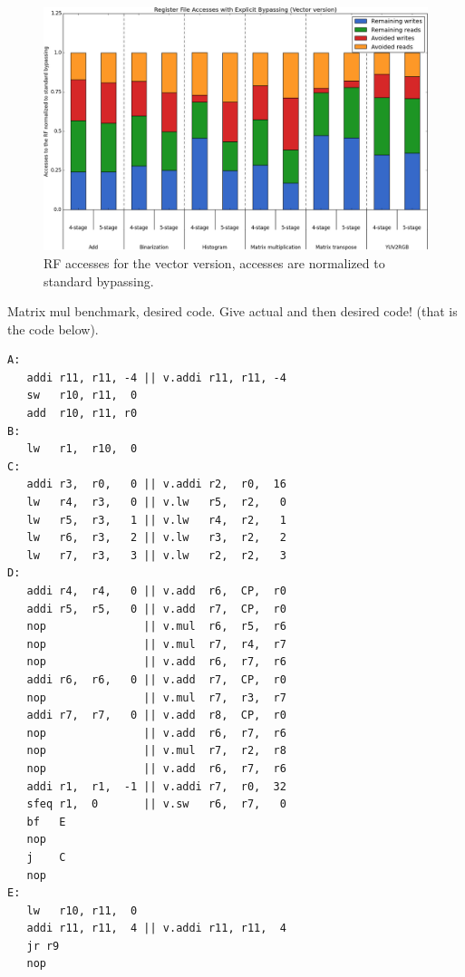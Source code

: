 \begin{figure}[t!]
\centering
\hspace*{-.12in}
\includegraphics[width=\textwidth]{figures/stats/vec_accesses}
\caption{RF accesses for the vector version, accesses are normalized to standard bypassing.}
\label{fig:vec_accesses}
\end{figure}


\newpage

Matrix mul benchmark, desired code. Give actual and then desired code! (that is the code below).






\begin{lstlisting}
A:
   addi r11, r11, -4 || v.addi r11, r11, -4
   sw   r10, r11,  0
   add  r10, r11, r0
B:
   lw   r1,  r10,  0
C:
   addi r3,  r0,   0 || v.addi r2,  r0,  16
   lw   r4,  r3,   0 || v.lw   r5,  r2,   0
   lw   r5,  r3,   1 || v.lw   r4,  r2,   1
   lw   r6,  r3,   2 || v.lw   r3,  r2,   2
   lw   r7,  r3,   3 || v.lw   r2,  r2,   3
D:
   addi r4,  r4,   0 || v.add  r6,  CP,  r0
   addi r5,  r5,   0 || v.add  r7,  CP,  r0
   nop               || v.mul  r6,  r5,  r6
   nop               || v.mul  r7,  r4,  r7
   nop               || v.add  r6,  r7,  r6
   addi r6,  r6,   0 || v.add  r7,  CP,  r0
   nop               || v.mul  r7,  r3,  r7
   addi r7,  r7,   0 || v.add  r8,  CP,  r0
   nop               || v.add  r6,  r7,  r6
   nop               || v.mul  r7,  r2,  r8
   nop               || v.add  r6,  r7,  r6
   addi r1,  r1,  -1 || v.addi r7,  r0,  32
   sfeq r1,  0       || v.sw   r6,  r7,   0
   bf   E
   nop
   j    C  
   nop
E:
   lw   r10, r11,  0
   addi r11, r11,  4 || v.addi r11, r11,  4
   jr r9
   nop
\end{lstlisting}